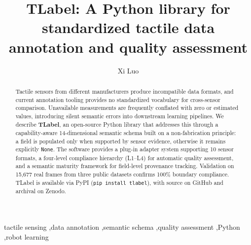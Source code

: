 \documentclass[preprint,12pt,a4paper]{elsarticle}
\begin{document}
\begin{frontmatter}

\title{TLabel: A Python library for standardized tactile data annotation and quality assessment}

\author[niuxiu]{Xi Luo}
\address[niuxiu]{Tactile Intelligence Lab, Niuxiu Technology, Hangzhou, China}

\begin{abstract}
Tactile sensors from different manufacturers produce incompatible data formats, and current annotation tooling provides no standardized vocabulary for cross-sensor comparison. Unavailable measurements are frequently conflated with zero or estimated values, introducing silent semantic errors into downstream learning pipelines. We describe \textbf{TLabel}, an open-source Python library that addresses this through a capability-aware 14-dimensional semantic schema built on a non-fabrication principle: a field is populated only when supported by sensor evidence, otherwise it remains explicitly \texttt{None}. The software provides a plug-in adapter system supporting 10 sensor formats, a four-level compliance hierarchy (L1--L4) for automatic quality assessment, and a semantic maturity framework for field-level provenance tracking. Validation on 15,677 real frames from three public datasets confirms 100\% boundary compliance. TLabel is available via PyPI (\texttt{pip install tlabel}), with source on GitHub and archival on Zenodo.
\end{abstract}

\begin{keyword}
tactile sensing \sep data annotation \sep semantic schema \sep quality assessment \sep Python \sep robot learning
\end{keyword}

\end{frontmatter}

\end{document}
